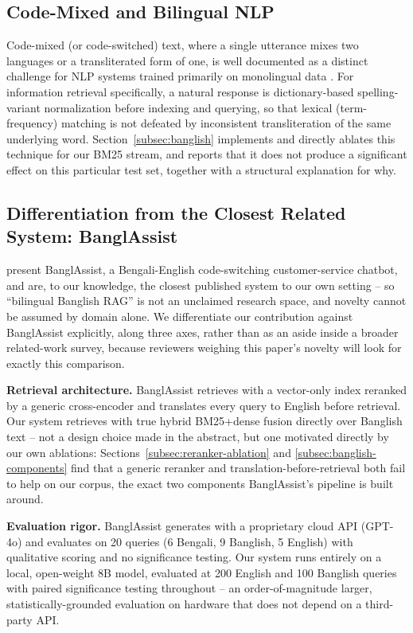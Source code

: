 \documentclass[a4paper,twoside]{article}
\begin{document}
\subsection{Code-Mixed and Bilingual NLP}

Code-mixed (or code-switched) text, where a single utterance mixes two languages or a transliterated form of one, is well documented as a distinct challenge for NLP systems trained primarily on monolingual data \citep{khanuja2020gluecos}. For information retrieval specifically, a natural response is dictionary-based spelling-variant normalization before indexing and querying, so that lexical (term-frequency) matching is not defeated by inconsistent transliteration of the same underlying word. Section~\ref{subsec:banglish} implements and directly ablates this technique for our BM25 stream, and reports that it does not produce a significant effect on this particular test set, together with a structural explanation for why.

\subsection{Differentiation from the Closest Related System: BanglAssist}
\label{subsec:banglassist-differentiation}

\citet{kruk2025banglassist} present BanglAssist, a Bengali-English code-switching customer-service chatbot, and are, to our knowledge, the closest published system to our own setting -- so ``bilingual Banglish RAG'' is not an unclaimed research space, and novelty cannot be assumed by domain alone. We differentiate our contribution against BanglAssist explicitly, along three axes, rather than as an aside inside a broader related-work survey, because reviewers weighing this paper's novelty will look for exactly this comparison.

\textbf{Retrieval architecture.} BanglAssist retrieves with a vector-only index reranked by a generic cross-encoder and translates every query to English before retrieval. Our system retrieves with true hybrid BM25+dense fusion directly over Banglish text -- not a design choice made in the abstract, but one motivated directly by our own ablations: Sections~\ref{subsec:reranker-ablation} and \ref{subsec:banglish-components} find that a generic reranker and translation-before-retrieval both fail to help on our corpus, the exact two components BanglAssist's pipeline is built around.

\textbf{Evaluation rigor.} BanglAssist generates with a proprietary cloud API (GPT-4o) and evaluates on 20 queries (6 Bengali, 9 Banglish, 5 English) with qualitative scoring and no significance testing. Our system runs entirely on a local, open-weight 8B model, evaluated at 200 English and 100 Banglish queries with paired significance testing throughout -- an order-of-magnitude larger, statistically-grounded evaluation on hardware that does not depend on a third-party API.
\end{document}
